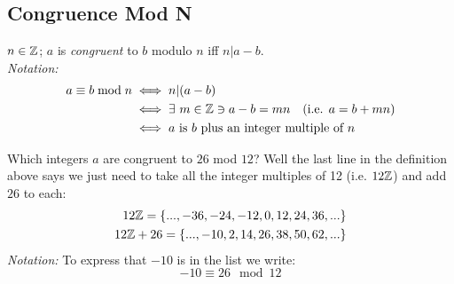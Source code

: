 \subsection{Congruence Mod N}
\begin{definition}
$n\in {\mathbb{ Z}}$; $a$ is \textit{congruent} to $b$ modulo $n$ iff $n|a-b$.\\
\textit{Notation:} 
\begin{align}
    a\equiv b \bmod n &\iff n|(a-b) \nonumber \\
    &\iff \exists \ m\in {\mathbb{ Z}} \ni a-b=mn \ \ \ (\text{i.e. } a=b+mn) \nonumber \\
    &\iff a \text{ is } b \text{ plus an integer multiple of } n \nonumber
\end{align}
\end{definition}
\begin{example}
Which integers $a$ are congruent to $26$ mod $12$? Well the last line in the definition above says we just need to take all the integer multiples of 12 (i.e. $12{\mathbb{ Z}}$) and add $26$ to each:
\begin{align}
    12{\mathbb{ Z}}= \{...,-36,-24,-12,0,12,24,36,...\}\nonumber\\
    12{\mathbb{ Z}}+26= \{...,-10,2,14,26,38,50,62,...\}\nonumber
\end{align}
\textit{Notation:} To express that $-10$ is in the list we write:
\begin{equation}
    -10\equiv 26 \mod 12 \nonumber
\end{equation}
\end{example}
